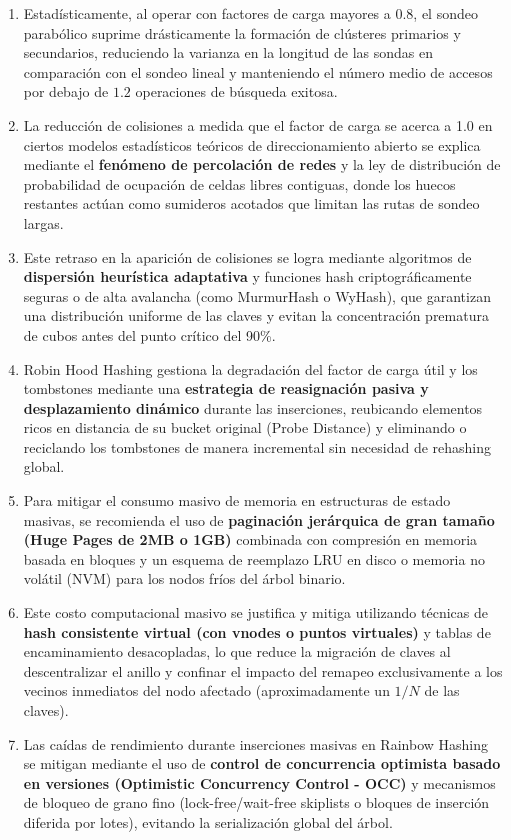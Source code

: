 \documentclass[12pt,a4paper]{report}
\begin{document}
\begin{enumerate}
    \item Estadísticamente, al operar con factores de carga mayores a 0.8, el sondeo parabólico suprime drásticamente la formación de clústeres primarios y secundarios, reduciendo la varianza en la longitud de las sondas en comparación con el sondeo lineal y manteniendo el número medio de accesos por debajo de $1.2$ operaciones de búsqueda exitosa.
    \item La reducción de colisiones a medida que el factor de carga se acerca a 1.0 en ciertos modelos estadísticos teóricos de direccionamiento abierto se explica mediante el \textbf{fenómeno de percolación de redes} y la ley de distribución de probabilidad de ocupación de celdas libres contiguas, donde los huecos restantes actúan como sumideros acotados que limitan las rutas de sondeo largas.
    \item Este retraso en la aparición de colisiones se logra mediante algoritmos de \textbf{dispersión heurística adaptativa} y funciones hash criptográficamente seguras o de alta avalancha (como MurmurHash o WyHash), que garantizan una distribución uniforme de las claves y evitan la concentración prematura de cubos antes del punto crítico del 90\%.
    \item Robin Hood Hashing gestiona la degradación del factor de carga útil y los tombstones mediante una \textbf{estrategia de reasignación pasiva y desplazamiento dinámico} durante las inserciones, reubicando elementos ricos en distancia de su bucket original (Probe Distance) y eliminando o reciclando los tombstones de manera incremental sin necesidad de rehashing global.
    \item Para mitigar el consumo masivo de memoria en estructuras de estado masivas, se recomienda el uso de \textbf{paginación jerárquica de gran tamaño (Huge Pages de 2MB o 1GB)} combinada con compresión en memoria basada en bloques y un esquema de reemplazo LRU en disco o memoria no volátil (NVM) para los nodos fríos del árbol binario.
    \item Este costo computacional masivo se justifica y mitiga utilizando técnicas de \textbf{hash consistente virtual (con vnodes o puntos virtuales)} y tablas de encaminamiento desacopladas, lo que reduce la migración de claves al descentralizar el anillo y confinar el impacto del remapeo exclusivamente a los vecinos inmediatos del nodo afectado (aproximadamente un $1/N$ de las claves).
    \item Las caídas de rendimiento durante inserciones masivas en Rainbow Hashing se mitigan mediante el uso de \textbf{control de concurrencia optimista basado en versiones (Optimistic Concurrency Control - OCC)} y mecanismos de bloqueo de grano fino (lock-free/wait-free skiplists o bloques de inserción diferida por lotes), evitando la serialización global del árbol.

\end{enumerate}
\end{document}

